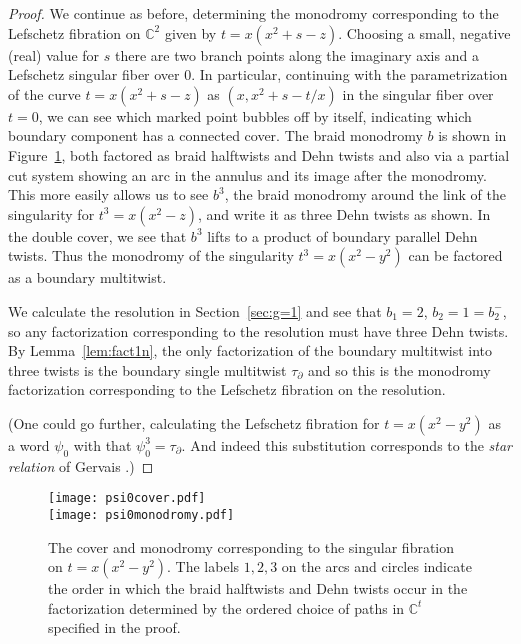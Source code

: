 \documentclass[11pt,letterpaper,reqno]{amsart}
\theoremstyle{remark}
\def \bdry {\partial}
\newcommand{\CC}{{\mathbb C}}
\begin{document}
\begin{proof}
We continue as before, determining the monodromy corresponding to the Lefschetz fibration on $\CC^2$ given by $t = x(x^2 +s -z)$. Choosing a small, negative (real) value for $s$ there are two branch points along the imaginary axis and a Lefschetz singular fiber over 0. In particular, continuing with the parametrization of the curve $t = x(x^2 +s -z)$ as $(x, x^2 + s - t/x)$ in the singular fiber over $t=0$, we can see which marked point bubbles off by itself, indicating which boundary component has a connected cover. The braid monodromy $b$ is shown in Figure~\ref{fig:psi0}, both factored as braid halftwists and Dehn twists and also via a partial cut system showing an arc in the annulus and its image after the monodromy. This more easily allows us to see $b^3$, the braid monodromy around the link of the singularity for $t^3 = x(x^2-z)$, and write it as three Dehn twists as shown. In the double cover, we see that $b^3$ lifts to a product of boundary parallel Dehn twists. Thus the monodromy of the singularity $t^3 = x(x^2-y^2)$ can be factored as a boundary multitwist. 

We calculate the resolution in Section~\ref{sec:g=1} and see that $b_1 = 2$, $b_2 = 1 = b_2^-$, so any factorization corresponding to the resolution must have three Dehn twists. By Lemma~\ref{lem:fact1n}, the only factorization of the boundary multitwist into three twists is the boundary single multitwist $\tau_\bdry$ and so this is the monodromy factorization corresponding to the Lefschetz fibration on the resolution. 

(One could go further, calculating the Lefschetz fibration for $t = x(x^2-y^2)$ as a word $\psi_0$ with that $\psi_0^3 = \tau_\bdry$. And indeed this substitution corresponds to the \emph{star relation} of Gervais \cite{Gervais}.)
\end{proof}


\begin{figure}
    \centering
    \texttt{[image: psi0cover.pdf]}\\
    \vspace{0.2in}
    \texttt{[image: psi0monodromy.pdf]}
    \caption{The cover and monodromy corresponding to the singular fibration on $t = x(x^2-y^2)$. The labels $1, 2, 3$ on the arcs and circles indicate the order in which the braid halftwists and Dehn twists occur in the factorization determined by the ordered choice of paths in $\CC^t$ specified in the proof.}
    \label{fig:psi0}
\end{figure}
\end{document}
